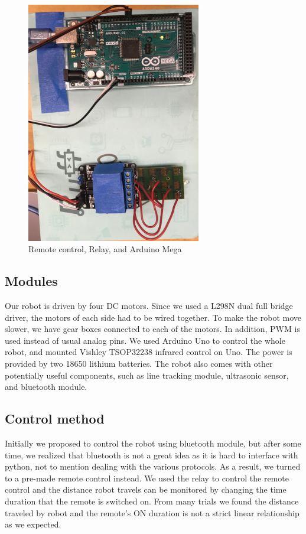 \documentclass[reprint,amsmath, amsfonts, amssymb, aps, letterpaper]{revtex4-1}
\begin{document}
\begin{figure}[!htb]
\begin{center}
\includegraphics[width=3in]{./figure/relay.jpg}
\caption{Remote control, Relay, and Arduino Mega}
\label{fig1}
\end{center}
\end{figure}

\subsection{Modules}
Our robot is driven by four DC motors. Since we used a L298N dual full bridge driver, the motors of each side had to be wired together. To make the robot move slower, we have gear boxes connected to each of the motors. In addition, PWM is used instead of usual analog pins. We used Arduino Uno to control the whole robot, and mounted Vishley TSOP32238 infrared control on Uno. The power is provided by two 18650 lithium batteries. The robot also comes with other potentially useful components, such as line tracking module, ultrasonic sensor, and bluetooth module.

\subsection{Control method}
Initially we proposed to control the robot using bluetooth module, but after some time, we realized that bluetooth is not a great idea as it is hard to interface with python, not to mention dealing with the various protocols. As a result, we turned to a pre-made remote control instead. We used the relay to control the remote control and the distance robot travels can be monitored by changing the time duration that the remote is switched on. From many trials we found the distance traveled by robot and the remote's ON duration is not a strict linear relationship as we expected. 
\end{document}
